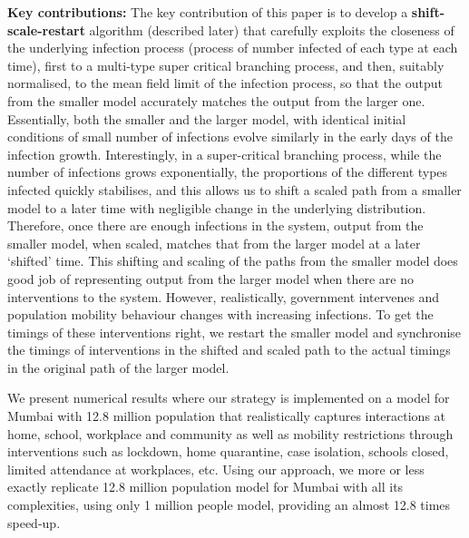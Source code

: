 \documentclass{article}
\theoremstyle{definition}
\begin{document}
\bigskip


{\noindent \bf Key contributions:} The key contribution of this paper is to develop a {\bf shift-scale-restart} algorithm (described later)  that  carefully exploits the closeness
of the underlying infection process (process of number infected 
of each type at each time), first to a multi-type super critical branching process, and then, suitably normalised, 
 to the mean field limit of the infection process,
so that the output from the smaller model accurately 
matches the output from the larger one. 
Essentially, both the smaller and the larger model, with identical initial conditions of small number of infections
evolve similarly in the early days of the infection growth.  
Interestingly, in a super-critical branching process, while the number of infections grows exponentially, the proportions of the different types infected quickly stabilises, and this allows us to shift a scaled
path from a smaller model to a later time with negligible change in the underlying distribution.
Therefore, once there are enough infections in the system, output from the smaller model, when scaled, matches that from the larger model at a later `shifted' time.
This shifting and scaling of the paths from the smaller model does good job of representing output from the larger model when there are no interventions
to the system. However, realistically, government intervenes and population mobility behaviour changes with increasing infections. 
To get the timings of these interventions right, we restart the smaller model and synchronise the timings of interventions in the shifted and scaled path to the actual timings in the original path of the larger model.

We present numerical results where our strategy is implemented on a  model
for Mumbai with 12.8 million population that realistically captures  interactions at home, school, workplace and community as well as mobility
restrictions through  interventions such as lockdown, home quarantine, case isolation, schools closed, limited attendance at workplaces, etc.
Using our approach, we more or less exactly replicate 12.8 million population model for Mumbai with all its complexities, using only 1 million people model, providing an almost 12.8 times speed-up.
\end{document}
